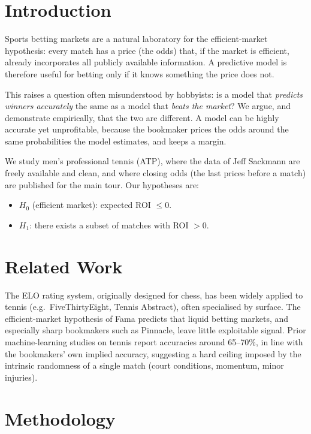 \documentclass[10pt,twocolumn]{article}
\begin{document}
\section{Introduction}
Sports betting markets are a natural laboratory for the efficient-market
hypothesis: every match has a price (the odds) that, if the market is efficient,
already incorporates all publicly available information. A predictive model is
therefore useful for betting only if it knows something the price does not.

This raises a question often misunderstood by hobbyists: is a model that
\emph{predicts winners accurately} the same as a model that \emph{beats the
market}? We argue, and demonstrate empirically, that the two are different. A
model can be highly accurate yet unprofitable, because the bookmaker prices the
odds around the same probabilities the model estimates, and keeps a margin.

We study men's professional tennis (ATP), where the data of Jeff Sackmann are
freely available and clean, and where closing odds (the last prices before a
match) are published for the main tour. Our hypotheses are:
\begin{itemize}[leftmargin=1.2em,itemsep=1pt]
  \item $H_0$ (efficient market): expected ROI $\le 0$.
  \item $H_1$: there exists a subset of matches with ROI $> 0$.
\end{itemize}

\section{Related Work}
The ELO rating system, originally designed for chess, has been widely applied to
tennis (e.g.\ FiveThirtyEight, Tennis Abstract), often specialised by surface.
The efficient-market hypothesis of Fama predicts that liquid betting markets, and
especially sharp bookmakers such as Pinnacle, leave little exploitable signal.
Prior machine-learning studies on tennis report accuracies around 65--70\%,
in line with the bookmakers' own implied accuracy, suggesting a hard ceiling
imposed by the intrinsic randomness of a single match (court conditions,
momentum, minor injuries).

\section{Methodology}
\end{document}

